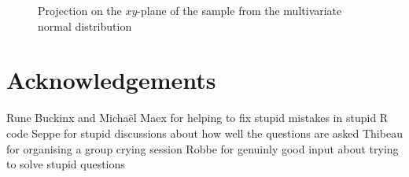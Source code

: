 \documentclass[a4paper]{article}
\begin{document}
\begin{figure}
	\centering
	
	\caption{Projection on the $xy$-plane of the sample from the multivariate normal distribution}
	\label{fig:sample}
\end{figure}

\section*{Acknowledgements}
Rune Buckinx and Michaël Maex for helping to fix stupid mistakes in stupid R code
Seppe for stupid discussions about how well the questions are asked
Thibeau for organising a group crying session
Robbe for genuinly good input about trying to solve stupid questions


\end{document}
